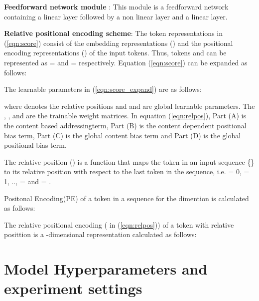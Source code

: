 \documentclass[11pt]{article}
\begin{document}
\textbf{Feedforward network module} :  This module is a feedforward network containing a linear layer followed by a non linear layer and a linear layer.

\textbf{Relative positional encoding scheme}: The token representations in (\ref{eqn:score}) consist of the embedding representations () and the positional encoding representations () of the input tokens. Thus, tokens  and  can be represented as =  and =  respectively. Equation (\ref{eqn:score}) can be expanded as follows:




The learnable parameters in (\ref{eqn:score_expand}) are as follows:






where  denotes the relative positions and  and    are global learnable parameters. The , ,  and   are the trainable weight matrices. In equation (\ref{eqn:relpos}), Part (A) is the content based addressingterm, Part (B) is the content dependent positional bias term, Part (C) is the global content bias term and Part (D) is the global positional bias term. 


The relative position () is a function that maps the  token in an input sequence \{\} to its relative position with respect to the last token in the sequence, i.e.  = 0,  = 1, .., =  and  = .



Positonal Encoding(PE) of a token in a sequence for the  dimention is calculated as follows:



The relative positional encoding ( in (\ref{eqn:relpos})) of a token with relative posittion  is a -dimensional representation calculated as follows:







\section{Model Hyperparameters and
experiment settings}
\label{appendix:params}
\end{document}
